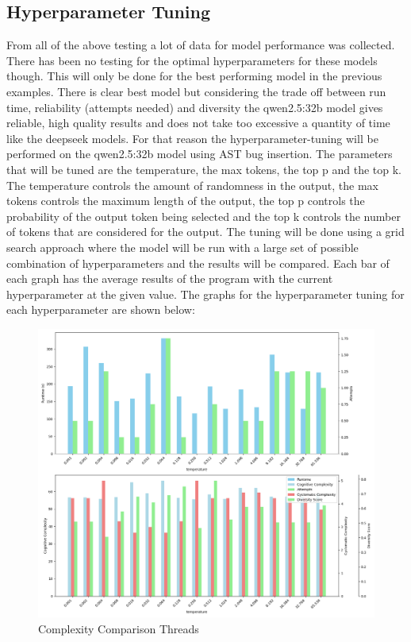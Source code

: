 \documentclass[12pt]{extarticle}
\begin{document}
\subsection{Hyperparameter Tuning}

From all of the above testing a lot of data for model performance was collected. There has been no testing for the optimal hyperparameters for these models though. This will only be done for the best performing model in the previous examples. There is clear best model but considering the trade off between run time, reliability (attempts needed) and diversity the qwen2.5:32b model gives reliable, high quality results and does not take too excessive a quantity of time like the deepseek models. For that reason the hyperparameter-tuning will be performed on the qwen2.5:32b model using AST bug insertion. The parameters that will be tuned are the temperature, the max tokens, the top p and the top k. The temperature controls the amount of randomness in the output, the max tokens controls the maximum length of the output, the top p controls the probability of the output token being selected and the top k controls the number of tokens that are considered for the output. The tuning will be done using a grid search approach where the model will be run with a large set of possible combination of hyperparameters and the results will be compared. Each bar of each graph has the average results of the program with the current hyperparameter at the given value. The graphs for the hyperparameter tuning for each hyperparameter are shown below:

\begin{figure}[H]
\centering
\includegraphics[width=0.7\linewidth]{Images/Hyperparam_temperature_Comparison.png}
\caption{Complexity Comparison Threads}
\label{fig:Complexity_Comparison_Threads}
\end{figure}
\end{document}

